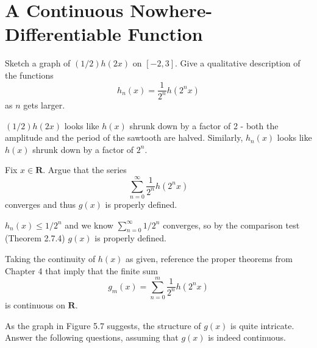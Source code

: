 \section{A Continuous Nowhere-Differentiable Function}

\begin{exercise}
    Sketch a graph of \((1/2)h(2x)\) on \([-2,3]\). Give a qualitative description of the functions
    \[h_n(x) = \frac{1}{2^n}h(2^n x)\] as \(n\) gets larger.
\end{exercise}

\begin{solution}
\((1/2)h(2x)\) looks like \(h(x)\) shrunk down by a factor of 2 - both the amplitude and the period of the sawtooth are halved. Similarly, \(h_n(x)\) looks like \(h(x)\) shrunk down by a factor of \(2^n\).
\end{solution}

\begin{exercise}
 Fix $x \in \mathbf{R}$. Argue that the series
\[
\sum_{n=0}^{\infty} \frac{1}{2^{n}} h\left(2^{n} x\right)
\]
converges and thus $g(x)$ is properly defined.
\end{exercise}

\begin{solution}
\(h_n(x) \leq 1/2^n\) and we know \(\sum^\infty_{n=0} 1/2^n\) converges, so by the comparison test (Theorem 2.7.4) \(g(x)\) is properly defined.
\end{solution}

\begin{exercise}
Taking the continuity of $h(x)$ as given, reference the proper theorems from Chapter 4 that imply that the finite sum
\[
g_{m}(x)=\sum_{n=0}^{m} \frac{1}{2^{n}} h\left(2^{n} x\right)
\]
is continuous on $\mathbf{R}$.
\end{exercise}

\begin{exercise}
As the graph in Figure 5.7 suggests, the structure of $g(x)$ is quite intricate. Answer the following questions, assuming that $g(x)$ is indeed continuous.
\end{exercise}

